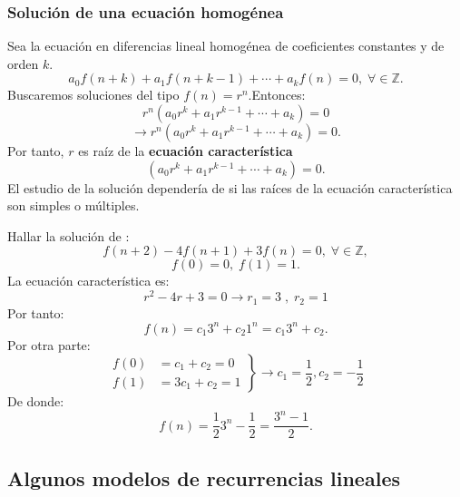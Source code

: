\subsubsection{Solución de una ecuación homogénea}
Sea la ecuación en diferencias lineal homogénea de coeficientes constantes y de orden $ k $.
$$
a_{0}f(n+k)+a_{1}f(n+k-1)+\cdots+a_{k}f(n)=0, \; \forall \in \mathds{Z}.
$$
Buscaremos soluciones del tipo $ f(n)=r^{n} .$Entonces:
$$
r^{n}(a_{0}r^{k}+a_{1}r^{k-1}+\cdots+a_{k})=0
$$
$$
\longrightarrow r^{n}(a_{0}r^{k}+a_{1}r^{k-1}+\cdots+a_{k})=0.
$$
Por tanto, $ r $ es raíz de la {\bf ecuación característica}
$$
(a_{0}r^{k}+a_{1}r^{k-1}+\cdots+a_{k})=0.
$$
El estudio de la solución dependería de si las raíces de la
ecuación característica son simples o múltiples.
\begin{example}
	Hallar la solución de :
	$$
	f(n+2)-4f(n+1)+3f(n)=0, \; \forall \in \mathds{Z},
	$$
	$$
	f(0)=0, \; f(1)=1.
	$$
	La ecuación característica es:
	$$
	r^{2}-4r+3=0 \rightarrow r_{1}=3\; , \; r_{2}=1
	$$
	Por tanto:
	$$
	f(n)=c_{1}3^{n}+c_{2}1^{n}=c_{1}3^{n}+c_{2}.
	$$
	Por otra parte:
\begin{equation*}
\left.\begin{aligned}
f(0)&=c_{1}+c_{2}=0\\
f(1)&=3c_{1}+c_{2}=1
\end{aligned}
\right\}
\longrightarrow c_{1}=\frac{1}{2},c_{2}=-\frac{1}{2}
\end{equation*}
	De donde:
	$$
	f(n)=\frac{1}{2}3^{n}-\frac{1}{2}=\frac{3^{n}-1}{2}.
	$$
	
	
\end{example}

\subsection{Algunos modelos de recurrencias lineales}

